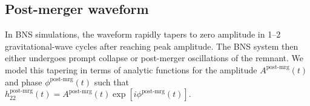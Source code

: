 \documentclass[prd,aps,letter,twocolumn,floatfix,notitlepage,nofootinbib]{revtex4-1}
\newcommand{\red}[1]{\textcolor{red}{#1}}
\begin{document}



\subsection{Post-merger waveform}

In BNS simulations, the waveform rapidly tapers to zero amplitude in 1--2 gravitational-wave cycles after reaching peak amplitude. The BNS system then either undergoes prompt collapse or post-merger oscillations of the remnant. We model this tapering in terms of analytic functions for the amplitude $A^{\textrm{post-mrg}}(t)$ and phase $\phi^{\textrm{post-mrg}}(t)$ such that $h_{22}^{\textrm{post-mrg}}(t) = A^{\textrm{post-mrg}}(t) \exp{[i\phi^{\textrm{post-mrg}}(t)]}$. 
\end{document}

